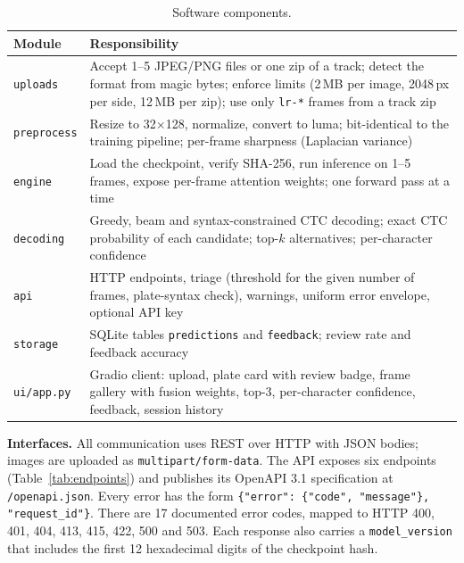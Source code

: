 \documentclass[11pt,a4paper]{article}
\begin{document}
\begin{table}[H]
\centering\small
\caption{Software components.}\label{tab:components}
\begin{tabularx}{\textwidth}{@{}P{2.7cm}L@{}}
\toprule
Module & Responsibility \\
\midrule
\texttt{uploads} & Accept 1--5 JPEG/PNG files or one zip of a track; detect the format from magic bytes; enforce limits (2\,MB per image, 2048\,px per side, 12\,MB per zip); use only \texttt{lr-*} frames from a track zip \\
\texttt{preprocess} & Resize to 32$\times$128, normalize, convert to luma; bit-identical to the training pipeline; per-frame sharpness (Laplacian variance) \\
\texttt{engine} & Load the checkpoint, verify SHA-256, run inference on 1--5 frames, expose per-frame attention weights; one forward pass at a time \\
\texttt{decoding} & Greedy, beam and syntax-constrained CTC decoding; exact CTC probability of each candidate; top-$k$ alternatives; per-character confidence \\
\texttt{api} & HTTP endpoints, triage (threshold for the given number of frames, plate-syntax check), warnings, uniform error envelope, optional API key \\
\texttt{storage} & SQLite tables \texttt{predictions} and \texttt{feedback}; review rate and feedback accuracy \\
\texttt{ui/app.py} & Gradio client: upload, plate card with review badge, frame gallery with fusion weights, top-3, per-character confidence, feedback, session history \\
\bottomrule
\end{tabularx}
\end{table}

\textbf{Interfaces.} All communication uses REST over HTTP with JSON bodies; images are uploaded as \texttt{multipart/form-data}. The API exposes six endpoints (Table~\ref{tab:endpoints}) and publishes its OpenAPI 3.1 specification at \texttt{/openapi.json}. Every error has the form \texttt{\{"error": \{"code", "message"\}, "request\_id"\}}. There are 17 documented error codes, mapped to HTTP 400, 401, 404, 413, 415, 422, 500 and 503. Each response also carries a \texttt{model\_version} that includes the first 12 hexadecimal digits of the checkpoint hash.
\end{document}
